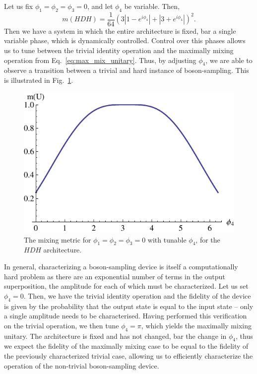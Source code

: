 \documentclass[aps,pra,twocolumn,amsmath,amssymb,nofootinbib,superscriptaddress]{revtex4}
\begin{document}
Let us fix $\phi_1=\phi_2=\phi_3=0$, and let $\phi_4$ be variable. Then,
\begin{equation}
m(HDH) = \frac{1}{64}\left(3|1-e^{i\phi_4}| + |3+e^{i\phi_4}| \right)^2.
\end{equation}
Then we have a system in which the entire architecture is fixed, bar a single variable phase, which is dynamically controlled. Control over this phases allows us to tune between the trivial identity operation and the maximally mixing operation from Eq.~\ref{eq:max_mix_unitary}. Thus, by adjusting $\phi_4$, we are able to observe a transition between a trivial and hard instance of boson-sampling. This is illustrated in Fig.~\ref{fig:mixing_fixed_phi4}.
\begin{figure}[!htb]
\includegraphics[width=0.8\columnwidth]{mixing_fixed_phi4}
\caption{The mixing metric for $\phi_1=\phi_2=\phi_3=0$ with tunable $\phi_4$, for the $HDH$ architecture.} \label{fig:mixing_fixed_phi4}
\end{figure}

In general, characterizing a boson-sampling device is itself a computationally hard problem as there are an exponential number of terms in the output superposition, the amplitude for each of which must be characterized. Let us set $\phi_4=0$. Then, we have the trivial identity operation and the fidelity of the device is given by the probability that the output state is equal to the input state -- only a single amplitude needs to be characterised. Having performed this verification on the trivial operation, we then tune $\phi_4=\pi$, which yields the maximally mixing unitary. The architecture is fixed and has not changed, bar the change in $\phi_4$, thus we expect the fidelity of the maximally mixing case to be equal to the fidelity of the previously characterized trivial case, allowing us to efficiently characterize the operation of the non-trivial boson-sampling device.
\end{document}
